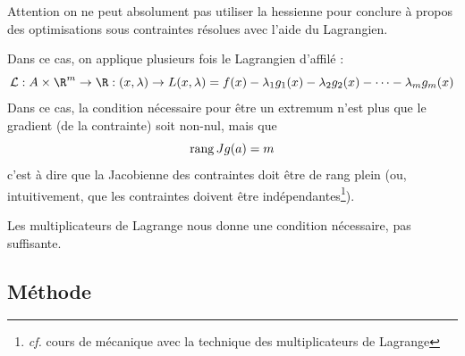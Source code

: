 \begin{myrem}
	Attention on ne peut absolument pas utiliser la hessienne pour conclure à propos des optimisations sous contraintes résolues avec l'aide du Lagrangien.
\end{myrem}

\begin{myprop}
	Dans ce cas, on applique plusieurs fois le Lagrangien d'affilé :
	\[ \mathcal{L} : A \times \R^m \to \R : (x, \lambda) \to L(x, \lambda) = f(x) - \lambda_1 g_1(x) - \lambda_2 g_2(x) - \cdots - \lambda_m g_m(x) \]
	Dans ce cas, la condition nécessaire pour être un extremum n'est plus
	que le gradient (de la contrainte) soit non-nul, mais que
	\[ \operatorname{rang} Jg(a) = m \]
	c'est à dire que la Jacobienne des contraintes doit être de rang plein (ou, intuitivement, que les contraintes doivent être indépendantes\footnote{\emph{cf.} cours de mécanique avec la technique des multiplicateurs de Lagrange}).
\end{myprop}

\begin{myrem}
	Les multiplicateurs de Lagrange nous donne une condition nécessaire, pas suffisante.
\end{myrem}

\subsection{Méthode}

